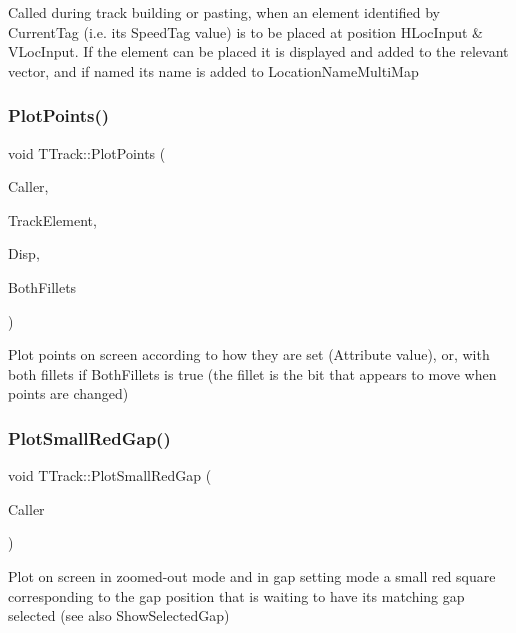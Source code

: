 Called during track building or pasting, when an element identified by Current\+Tag (i.\+e. its Speed\+Tag value) is to be placed at position H\+Loc\+Input \& V\+Loc\+Input. If the element can be placed it is displayed and added to the relevant vector, and if named its name is added to Location\+Name\+Multi\+Map \mbox{\label{class_t_track_af56adb319c7003b8ddac8e55afaee3d2}} 
\subsubsection{\texorpdfstring{Plot\+Points()}{PlotPoints()}}
{\footnotesize\ttfamily void T\+Track\+::\+Plot\+Points (\begin{DoxyParamCaption}\item[{int}]{Caller,  }\item[{\mbox{\hyperlink{class_t_track_element}{T\+Track\+Element}}}]{Track\+Element,  }\item[{\mbox{\hyperlink{class_t_display}{T\+Display}} $\ast$}]{Disp,  }\item[{bool}]{Both\+Fillets }\end{DoxyParamCaption})}

Plot points on screen according to how they are set (Attribute value), or, with both fillets if Both\+Fillets is true (the fillet is the bit that appears to move when points are changed) \mbox{\label{class_t_track_ab831c2f47850f3a89678491475d52d29}} 
\subsubsection{\texorpdfstring{Plot\+Small\+Red\+Gap()}{PlotSmallRedGap()}}
{\footnotesize\ttfamily void T\+Track\+::\+Plot\+Small\+Red\+Gap (\begin{DoxyParamCaption}\item[{int}]{Caller }\end{DoxyParamCaption})}

Plot on screen in zoomed-\/out mode and in gap setting mode a small red square corresponding to the gap position that is waiting to have its matching gap selected (see also Show\+Selected\+Gap) \mbox{\label{class_t_track_a4a948544c9ac877232ec721db8bfc914}} 
